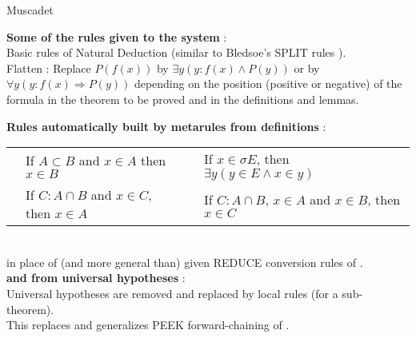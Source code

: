 
\calculusAcronym{\Muscadet}




\maketitle

\begin{entry}{Muscadet}  

\begin{calculus}

\textbf {Some of the rules given to the system} :\\
\hspace*{0.1cm} 
Basic rules of Natural Deduction (similar to Bledsoe's SPLIT rules ).\\
\hspace*{0.1cm} 
Flatten : Replace $P(f(x))$ by $\exists y(y:f(x) \land P(y))$ or by $\forall y (y:f(x) \Rightarrow P(y))$ depending on the position (positive or negative)
of the formula in the theorem to be proved and in the definitions and lemmas.

\textbf {Rules automatically built by metarules from  definitions} :\\
\begin{tabular}{llll}
\hspace{0.1cm} 
& If $A \subset B$ and $x \in A$ then $x \in B$  & \hspace{0.2cm} &
If $x \in \sigma E$, then $\exists y (y \in E \land x \in y)$\\
& If $C:A \cap B$ and $x \in C$, then $x \in A$  &                &
If $C : A \cap B$, $x \in A$ and $x \in B$, then $x \in C$ \\
\end{tabular}\\
\hspace*{0.15cm} in place of (and more general than) given 
REDUCE conversion rules of . \\
\textbf {and from universal hypotheses} :\\
\hspace*{0.1cm}Universal hypotheses are removed and replaced by local rules (for a sub-theorem).\\ 
\hspace*{0.1cm}This replaces and generalizes PEEK forward-chaining of . 
\end{calculus}


\end{entry}
